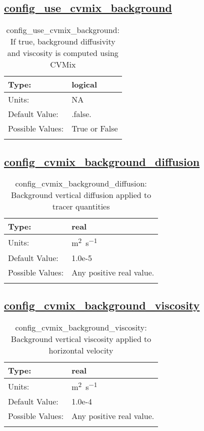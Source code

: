 \subsection[config\_use\_cvmix\_background]{\hyperref[sec:nm_tab_cvmix]{config\_use\_cvmix\_background}}
\label{subsec:nm_sec_config_use_cvmix_background}
\begin{center}
\begin{longtable}{| p{2.0in} || p{4.0in} |}
    \hline
    Type: & logical \\
    \hline
    Units: & \si{NA} \\
    \hline
    Default Value: & .false. \\
    \hline
    Possible Values: & True or False \\
    \hline
    \caption{config\_use\_cvmix\_background: If true, background diffusivity and viscosity is computed using CVMix}
\end{longtable}
\end{center}
\subsection[config\_cvmix\_background\_diffusion]{\hyperref[sec:nm_tab_cvmix]{config\_cvmix\_background\_diffusion}}
\label{subsec:nm_sec_config_cvmix_background_diffusion}
\begin{center}
\begin{longtable}{| p{2.0in} || p{4.0in} |}
    \hline
    Type: & real \\
    \hline
    Units: & \si{m^2.s^{-1}} \\
    \hline
    Default Value: & 1.0e-5 \\
    \hline
    Possible Values: & Any positive real value. \\
    \hline
    \caption{config\_cvmix\_background\_diffusion: Background vertical diffusion applied to tracer quantities}
\end{longtable}
\end{center}
\subsection[config\_cvmix\_background\_viscosity]{\hyperref[sec:nm_tab_cvmix]{config\_cvmix\_background\_viscosity}}
\label{subsec:nm_sec_config_cvmix_background_viscosity}
\begin{center}
\begin{longtable}{| p{2.0in} || p{4.0in} |}
    \hline
    Type: & real \\
    \hline
    Units: & \si{m^2.s^{-1}} \\
    \hline
    Default Value: & 1.0e-4 \\
    \hline
    Possible Values: & Any positive real value. \\
    \hline
    \caption{config\_cvmix\_background\_viscosity: Background vertical viscosity applied to horizontal velocity}
\end{longtable}
\end{center}

